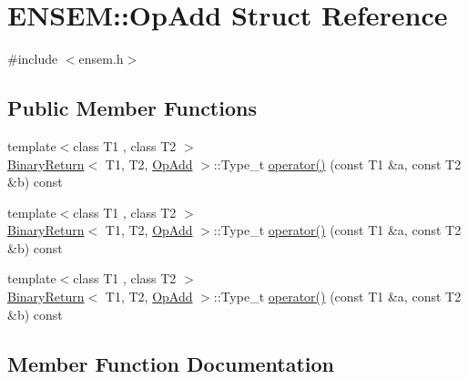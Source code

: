 \hypertarget{structENSEM_1_1OpAdd}{}\section{E\+N\+S\+EM\+:\+:Op\+Add Struct Reference}
\label{structENSEM_1_1OpAdd}


{\ttfamily \#include $<$ensem.\+h$>$}

\subsection*{Public Member Functions}
\begin{DoxyCompactItemize}
\item 
{\footnotesize template$<$class T1 , class T2 $>$ }\\\mbox{\hyperlink{structENSEM_1_1BinaryReturn}{Binary\+Return}}$<$ T1, T2, \mbox{\hyperlink{structENSEM_1_1OpAdd}{Op\+Add}} $>$\+::Type\+\_\+t \mbox{\hyperlink{structENSEM_1_1OpAdd_a5929c83274ec805686f85b4e65bd70c6}{operator()}} (const T1 \&a, const T2 \&b) const
\item 
{\footnotesize template$<$class T1 , class T2 $>$ }\\\mbox{\hyperlink{structENSEM_1_1BinaryReturn}{Binary\+Return}}$<$ T1, T2, \mbox{\hyperlink{structENSEM_1_1OpAdd}{Op\+Add}} $>$\+::Type\+\_\+t \mbox{\hyperlink{structENSEM_1_1OpAdd_a5929c83274ec805686f85b4e65bd70c6}{operator()}} (const T1 \&a, const T2 \&b) const
\item 
{\footnotesize template$<$class T1 , class T2 $>$ }\\\mbox{\hyperlink{structENSEM_1_1BinaryReturn}{Binary\+Return}}$<$ T1, T2, \mbox{\hyperlink{structENSEM_1_1OpAdd}{Op\+Add}} $>$\+::Type\+\_\+t \mbox{\hyperlink{structENSEM_1_1OpAdd_a5929c83274ec805686f85b4e65bd70c6}{operator()}} (const T1 \&a, const T2 \&b) const
\end{DoxyCompactItemize}


\subsection{Member Function Documentation}
\mbox{\label{structENSEM_1_1OpAdd_a5929c83274ec805686f85b4e65bd70c6}} 
